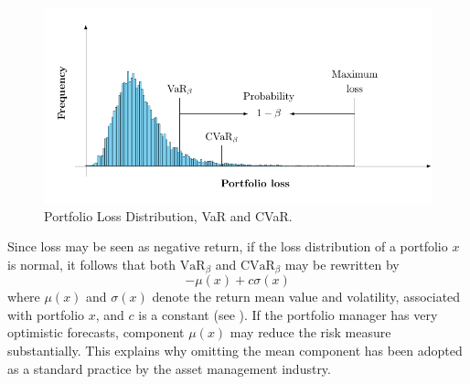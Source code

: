 \begin{figure}[!ht]
	\centering
	\includegraphics{figures/VarCvar.pdf}
	\caption{Portfolio Loss Distribution, VaR and CVaR.}
	\label{fig:VarCvar}
\end{figure}

\begin{remark}\normalfont\label{re:Normal}

	Since loss may be seen as negative return, if the loss distribution of a portfolio $x$ is normal, it follows that both $\mbox{VaR}_\beta$ and $\mbox{CVaR}_\beta$ may be rewritten by
	\[
		-\mu(x)+c\sigma(x)
	\]
	where $\mu(x)$ and $\sigma(x)$ denote the return mean value and volatility,  associated with portfolio $x$, and $c$ is a constant (see \cite[Chapter 2]{Roncalli2014}). If the portfolio manager has very optimistic forecasts, component $\mu(x)$ may reduce the risk measure substantially. This explains why omitting the mean component has been adopted as a standard practice by the asset management industry.
\end{remark}

